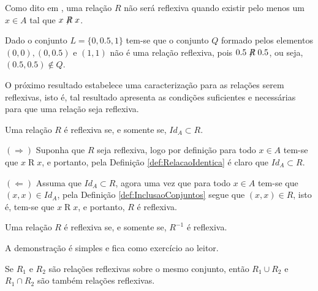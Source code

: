 Como dito em \cite{abe1991-TC}, uma relação $R$ não será reflexiva quando existir pelo menos um $x \in A$ tal que $x\centernot{R} x$.

\begin{exemplo}
	Dado o conjunto $L = \{0, 0.5, 1\}$ tem-se que o conjunto $Q$ formado pelos elementos $(0,0), (0,0.5)$ e $(1, 1)$ não é uma relação reflexiva, pois $0.5\centernot{R} 0.5$, ou seja, $(0.5, 0.5) \notin Q$.
\end{exemplo}

O próximo resultado estabelece uma caracterização para as relações serem reflexivas, isto é, tal resultado apresenta as condições suficientes e necessárias para que uma relação seja reflexiva.

\begin{teorema}\label{teo:CaracterizacaoRelacaoReflexivda}
	Uma relação $R$ é reflexiva se, e somente se, $Id_A \subset R$.
\end{teorema}

\begin{prova}
	$(\Rightarrow)$ Suponha que $R$ seja reflexiva, logo por definição para todo $x \in A$ tem-se que $x \mathrel{R} x$, e portanto, pela Definição \ref{def:RelacaoIdentica} é claro que $Id_A \subset R$.
	
	$(\Leftarrow)$ Assuma que $Id_A \subset R$, agora uma vez que para todo $x \in A$ tem-se que $(x, x) \in Id_A$, pela Definição \ref{def:InclusaoConjuntos} segue que $(x, x) \in R$, isto é, tem-se que $x \mathrel{R} x$, e portanto, $R$ é reflexiva.
\end{prova}

\begin{corolario}\label{col:CaracterizacaoRelacaoReflexivda}
	Uma relação $R$ é reflexiva se, e somente se, $R^{-1}$ é reflexiva.
\end{corolario}

\begin{prova}
	A demonstração é simples e fica como exercício ao leitor.
\end{prova}


\begin{teorema}\label{teo:FechoAlgebricoRelacoesReflexivas}
	Se $R_1$ e $R_2$ são relações reflexivas sobre o mesmo conjunto, então $R_1 \cup R_2$ e $R_1 \cap R_2$ são também relações reflexivas.
\end{teorema}

